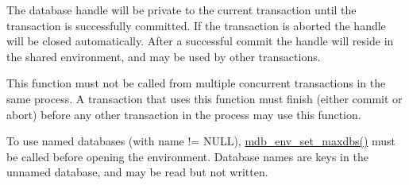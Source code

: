 The database handle will be private to the current transaction until the transaction is successfully committed. If the transaction is aborted the handle will be closed automatically. After a successful commit the handle will reside in the shared environment, and may be used by other transactions.

This function must not be called from multiple concurrent transactions in the same process. A transaction that uses this function must finish (either commit or abort) before any other transaction in the process may use this function.

To use named databases (with name != N\+U\+LL), \mbox{\hyperlink{group__mdb_gaa2fc2f1f37cb1115e733b62cab2fcdbc}{mdb\+\_\+env\+\_\+set\+\_\+maxdbs()}} must be called before opening the environment. Database names are keys in the unnamed database, and may be read but not written.


